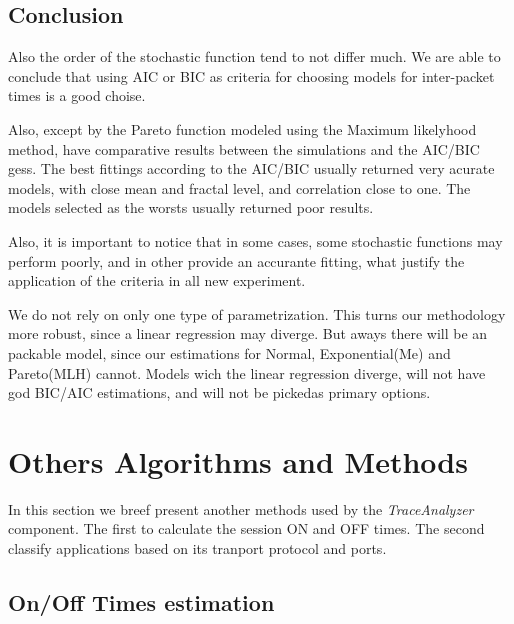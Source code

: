 \subsection{Conclusion}

Also the order of the stochastic function tend to not differ much. We are able to conclude that using AIC or BIC as criteria for choosing models for inter-packet times is a good choise.

Also, except by the Pareto function modeled using the Maximum likelyhood method, have comparative results between the simulations and the AIC/BIC gess. The best fittings according to the AIC/BIC usually  returned very acurate models, with close mean and fractal level, and correlation close to one. The models selected as the worsts usually returned poor results.

Also, it is important to notice that in some cases, some stochastic functions may perform poorly, and in other provide an accurante fitting, what justify the application of the criteria in all new experiment. 

We do not rely on only one type of parametrization. This turns our methodology more robust, since a linear regression may diverge. But aways there will be an packable model, since our estimations for Normal, Exponential(Me) and Pareto(MLH) cannot. Models wich the linear regression diverge, will not have god BIC/AIC estimations, and will not be pickedas primary options. 


\section{Others Algorithms and Methods}

In this section we breef present another methods used by the \textit{TraceAnalyzer} component. The first to calculate the session ON and OFF times. The second classify applications based on its tranport protocol and ports.


\subsection{On/Off Times estimation}


